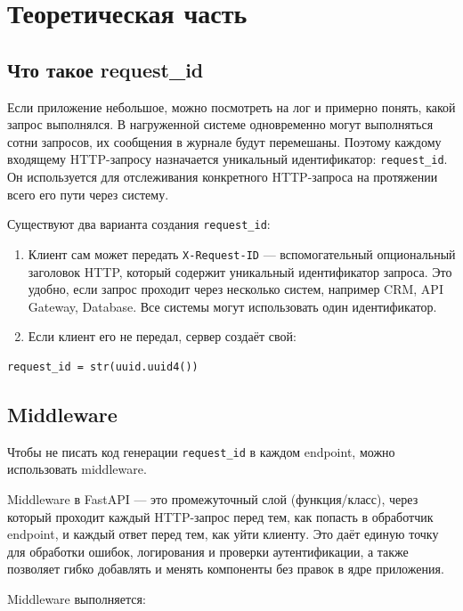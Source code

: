 \documentclass[12pt,a4paper]{article}
\begin{document}
\section{Теоретическая часть}

\subsection{Что такое request\_id}

Если приложение небольшое, можно посмотреть на лог и примерно понять, какой запрос выполнялся. В нагруженной системе одновременно могут выполняться сотни запросов, их сообщения в журнале будут перемешаны. Поэтому каждому входящему HTTP-запросу назначается уникальный идентификатор: \texttt{request\_id}. Он используется для отслеживания конкретного HTTP-запроса на протяжении всего его пути через систему.

Существуют два варианта создания \texttt{request\_id}:

\begin{enumerate}
    \item Клиент сам может передать \texttt{X-Request-ID} — вспомогательный опциональный заголовок HTTP, который содержит уникальный идентификатор запроса. Это удобно, если запрос проходит через несколько систем, например CRM, API Gateway, Database. Все системы могут использовать один идентификатор.
    \item Если клиент его не передал, сервер создаёт свой:
\end{enumerate}

\begin{lstlisting}[caption={Генерация request\_id}]
request_id = str(uuid.uuid4())
\end{lstlisting}

\subsection{Middleware}

Чтобы не писать код генерации \texttt{request\_id} в каждом endpoint, можно использовать middleware.

Middleware в FastAPI — это промежуточный слой (функция/класс), через который проходит каждый HTTP-запрос перед тем, как попасть в обработчик endpoint, и каждый ответ перед тем, как уйти клиенту. Это даёт единую точку для обработки ошибок, логирования и проверки аутентификации, а также позволяет гибко добавлять и менять компоненты без правок в ядре приложения.

Middleware выполняется:
\end{document}
